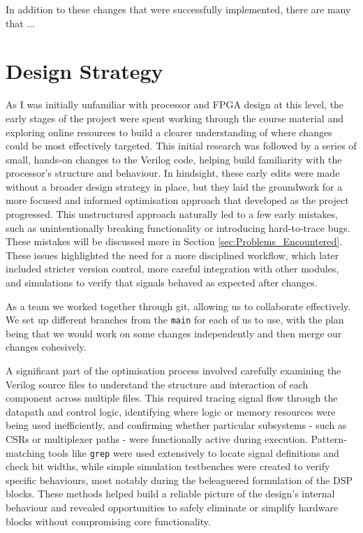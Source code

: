 \documentclass[a4paper,10pt]{article}
\begin{document}
In addition to these changes that were successfully implemented,
there are many that ...

\newpage

\section{Design Strategy}
\label{sec:Design_Strategy}

As I was initially unfamiliar with processor and FPGA design at this level, 
the early stages of the project were spent working through the course material 
and exploring online resources to build a clearer understanding of 
where changes could be most effectively targeted. 
This initial research was followed by a series of small, 
hands-on changes to the Verilog code, 
helping build familiarity with the processor's structure and behaviour.
In hindsight, these early edits were made 
without a broader design strategy in place, 
but they laid the groundwork for a more focused and informed optimisation approach 
that developed as the project progressed.
This unstructured approach naturally led to a few early mistakes, 
such as unintentionally breaking functionality or introducing hard-to-trace bugs.
These mistakes will be discussed more in Section \ref{sec:Problems_Encountered}.
These issues highlighted the need for a more disciplined workflow, 
which later included stricter version control, 
more careful integration with other modules, 
and simulations to verify that signals behaved as expected after changes.

As a team we worked together through git, allowing us to collaborate effectively.
We set up different branches from the \texttt{main} for each of us to use, 
with the plan being that we would work on some changes independently 
and then merge our changes cohesively.

A significant part of the optimisation process involved 
carefully examining the Verilog source files to understand 
the structure and interaction of each component
across multiple files. 
This required tracing signal flow through the datapath and control logic, 
identifying where logic or memory resources were being used inefficiently, 
and confirming whether particular subsystems - 
such as CSRs or multiplexer paths - 
were functionally active during execution. 
Pattern-matching tools like \texttt{grep} were used extensively 
to locate signal definitions and check bit widths, 
while simple simulation testbenches were created to verify specific behaviours,
most notably during the beleaguered formulation of the DSP blocks.
These methods helped build a reliable picture of the design's internal behaviour 
and revealed opportunities to safely eliminate or simplify hardware blocks 
without compromising core functionality.
\end{document}
